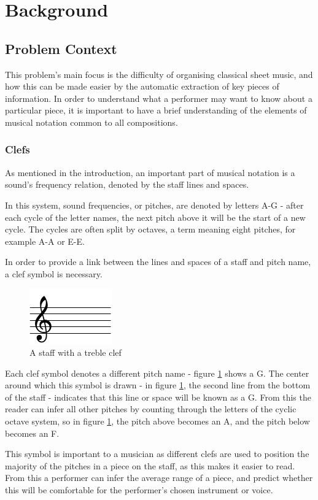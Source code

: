 \section{Background}
\subsection{Problem Context}
This problem's main focus is the difficulty of organising classical sheet music, and how this can be made easier by the automatic extraction of key pieces  of information. In order to understand what a performer may want to know about a particular piece, it is important to have a brief understanding of the elements of musical notation common to all compositions.
\subsubsection{Clefs}
As mentioned in the introduction, an important part of musical notation is a sound's frequency relation, denoted by the staff lines and spaces. 

In this system, sound frequencies, or pitches, are denoted by letters A-G - after each cycle of the letter names, the next pitch above it will be the start of a new cycle. The cycles are often split by octaves, a term meaning eight pitches, for example A-A or E-E. 

In order to provide a link between the lines and spaces of a staff and pitch name, a clef symbol is necessary.
\begin{figure}[h]
    \centering
        \includegraphics{clef-crop.pdf}
    \caption{A staff with a treble clef}
    \label{fig:clef}
\end{figure}

Each clef symbol denotes a different pitch name - figure \ref{fig:clef} shows a G. The center around which this symbol is drawn - in figure \ref{fig:clef}, the second line from the bottom of the staff - indicates that this line or space will be known as a G. From this the reader can infer all other pitches by counting through the letters of the cyclic octave system, so in figure \ref{fig:clef}, the pitch above becomes an A, and the pitch below becomes an F.

This symbol is important to a musician as different clefs are used to position the majority of the pitches in a piece on the staff, as this makes it easier to read. From this a performer can infer the average range of a piece, and predict whether this will be comfortable for the performer's chosen instrument or voice.

